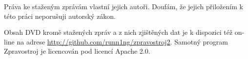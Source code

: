 \documentclass[12pt,a4paper]{report}
\let\openright=\clearpage
\begin{document}
Práva ke staženým zprávám vlastní jejich autoři. Doufám, že jejich přiložením k této práci neporušuji autorský zákon.

Obsah DVD kromě stažených zpráv a z nich zjištěných dat je k dispozici též on-line na adrese \url{http://github.com/runn1ng/zpravostroj2}. Samotný program Zpravostroj je licencován pod licencí Apache 2.0.


\openright
\end{document}
